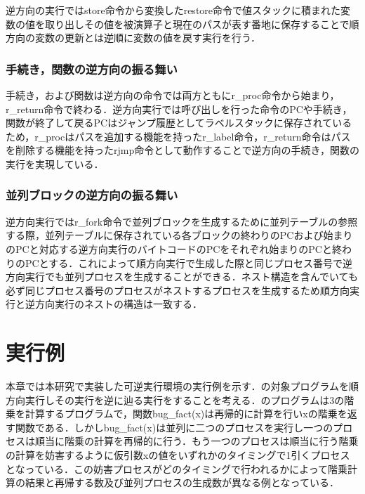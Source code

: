 \documentclass[submit,PRO]{ipsj}
\begin{document}
逆方向の実行ではstore命令から変換したrestore命令で値スタックに積まれた変数の値を取り出しその値を被演算子と現在のパスが表す番地に保存することで順方向の変数の更新とは逆順に変数の値を戻す実行を行う．

\subsubsection{手続き，関数の逆方向の振る舞い}

手続き，および関数は逆方向の命令では両方ともにr\_proc命令から始まり，r\_return命令で終わる．逆方向実行では呼び出しを行った命令のPCや手続き，関数が終了して戻るPCはジャンプ履歴としてラベルスタックに保存されているため，r\_procはパスを追加する機能を持ったr\_label命令，r\_return命令はパスを削除する機能を持ったrjmp命令として動作することで逆方向の手続き，関数の実行を実現している．

\subsubsection{並列ブロックの逆方向の振る舞い}

逆方向実行ではr\_fork命令で並列ブロックを生成するために並列テーブルの参照する際，並列テーブルに保存されている各ブロックの終わりのPCおよび始まりのPCと対応する逆方向実行のバイトコードのPCをそれぞれ始まりのPCと終わりのPCとする．これによって順方向実行で生成した際と同じプロセス番号で逆方向実行でも並列プロセスを生成することができる．ネスト構造を含んでいても必ず同じプロセス番号のプロセスがネストするプロセスを生成するため順方向実行と逆方向実行のネストの構造は一致する．


\section{実行例}

本章では本研究で実装した可逆実行環境の実行例を示す．の対象プログラムを順方向実行しその実行を逆に辿る実行をすることを考える．のプログラムは3の階乗を計算するプログラムで，関数bug\_fact(x)は再帰的に計算を行いxの階乗を返す関数である．しかしbug\_fact(x)は並列に二つのプロセスを実行し一つのプロセスは順当に階乗の計算を再帰的に行う．もう一つのプロセスは順当に行う階乗の計算を妨害するように仮引数xの値をいずれかのタイミングで1引くプロセスとなっている．この妨害プロセスがどのタイミングで行われるかによって階乗計算の結果と再帰する数及び並列プロセスの生成数が異なる例となっている．
\end{document}
